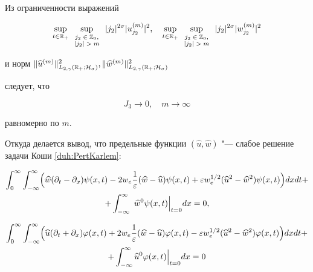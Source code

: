\smallskip



Из ограниченности выражений

$$

\sup_{t\in \mathbb R_{+}}

\sup_{\scriptsize

\begin{array}{c}

j_2\in \mathbb Z_0, \\

|j_2|> m

\end{array} } |j_2|^{2\sigma} |u_{j_2}^{(m)}|^2, \quad 

\sup_{t\in \mathbb R_{+}}

\sup_{\scriptsize

\begin{array}{c}

j_2\in \mathbb Z_0, \\ |j_2|> m

\end{array}} |j_2|^{2\sigma} |w_{j_2}^{(m)}|^2$$ 

и норм $\|\widehat{u}^{(m)}\|^2_{L_{2,\gamma}(\mathbb R_{+}; {\cal H}_{\sigma})},\|\widehat{w}^{(m)}\|^2_{L_{2,\gamma}(\mathbb R_{+}; {\cal H}_{\sigma})} $

следует, что

$$

J_3\to0,\quad m\to\infty

$$

равномерно по $m$. 

Откуда делается вывод, что предельные функции $(\widehat{u}, \widehat{w})$ "--- слабое решение задачи Коши \eqref{duh:PertKarlem}:

\begin{multline*}

\int_0^\infty 

\int_{-\infty}^\infty 

\Bigl(\widehat{w} (\pa_t-\pa_x)\psi(x,t)-2w_e\frac1\ve(\widehat{w}-\widehat{u})\psi(x,t)+\ve w_e^{1/2}(\widehat{u}^2-\widehat{w}^2) \psi(x,t)\Bigr) dxdt+

\\

+\int_{-\infty}^\infty~\widehat{w}^0 \psi(x,t)\Bigr|_{t=0} dx=0,

\end{multline*}

\begin{multline*}

\int_0^\infty \int_{-\infty}^\infty 

\Bigl( \widehat{u} (\pa_t+\pa_x)\varphi(x,t)+2w_e\frac1\ve(\widehat{w}-\widehat{u})\varphi(x,t)-\ve w_e^{1/2}(\widehat{u}^2-\widehat{w}^2) \varphi(x,t) \Bigr) dxdt+

\\

+\int_{-\infty}^\infty \widehat{u}^0 \varphi(x,t) \Bigr|_{t=0} dx=0

\end{multline*}

